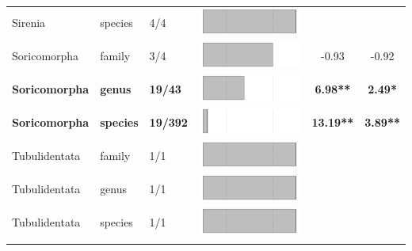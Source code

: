 \begin{longtable}{lL{1.8cm}C{2cm}lcc}
  Sirenia & species & 4/4 & \includegraphics[width=0.20\linewidth, height=0.05\linewidth]{Missing_mammals/Table_figures/bar78.pdf} &   &   \\ 
  Soricomorpha & family & 3/4 & \includegraphics[width=0.20\linewidth, height=0.05\linewidth]{Missing_mammals/Table_figures/bar79.pdf} & -0.93 & -0.92 \\ 
  \textbf{Soricomorpha} & \textbf{genus} & \textbf{19/43} & \includegraphics[width=0.20\linewidth, height=0.05\linewidth]{Missing_mammals/Table_figures/bar80.pdf} & \textbf{6.98**} & \textbf{2.49*} \\ 
  \textbf{Soricomorpha} & \textbf{species} & \textbf{19/392} & \includegraphics[width=0.20\linewidth, height=0.05\linewidth]{Missing_mammals/Table_figures/bar81.pdf} & \textbf{13.19**} & \textbf{3.89**} \\ 
  Tubulidentata & family & 1/1 & \includegraphics[width=0.20\linewidth, height=0.05\linewidth]{Missing_mammals/Table_figures/bar82.pdf} &   &   \\ 
  Tubulidentata & genus & 1/1 & \includegraphics[width=0.20\linewidth, height=0.05\linewidth]{Missing_mammals/Table_figures/bar83.pdf} &   &   \\ 
  Tubulidentata & species & 1/1 & \includegraphics[width=0.20\linewidth, height=0.05\linewidth]{Missing_mammals/Table_figures/bar84.pdf} &   &   \\ 
   \hline
\hline
\label{Table_results}
\end{longtable}
